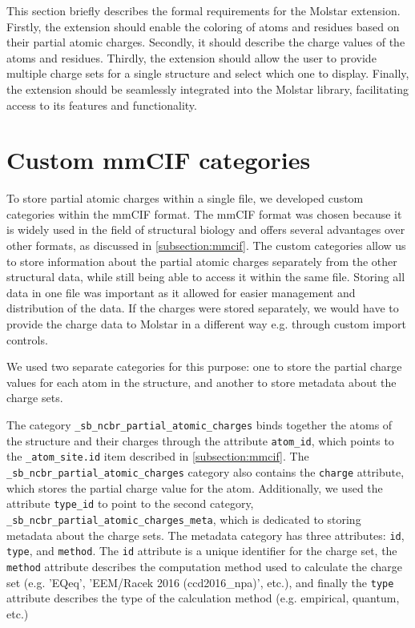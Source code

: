 \documentclass[
  digital,     %
  oneside,     %
  nosansbold,  %
  nocolorbold, %
  lof,         %
  lot,         %
]{fithesis4}
\begin{document}
This section briefly describes the formal requirements for the Molstar extension. Firstly, the extension should enable the coloring of atoms and residues based on their partial atomic charges. Secondly, it should describe the charge values of the atoms and residues. Thirdly, the extension should allow the user to provide multiple charge sets for a single structure and select which one to display. Finally, the extension should be seamlessly integrated into the Molstar library, facilitating access to its features and functionality.

\section{Custom mmCIF categories}
\label{section:custom_mmcif_categories}

To store partial atomic charges within a single file, we developed custom categories within the mmCIF format. The mmCIF format was chosen because it is widely used in the field of structural biology and offers several advantages over other formats, as discussed in \ref{subsection:mmcif}. The custom categories allow us to store information about the partial atomic charges separately from the other structural data, while still being able to access it within the same file. Storing all data in one file was important as it allowed for easier management and distribution of the data. If the charges were stored separately,
we would have to provide the charge data to Molstar in a different way e.g. through custom import controls.


We used two separate categories for this purpose: one to store the partial charge values for each atom in the structure, and another to store metadata about the charge sets.

The category \texttt{\_sb\_ncbr\_partial\_atomic\_charges} binds together the atoms of the structure and their charges through the attribute \texttt{atom\_id}, which points to the \texttt{\_atom\_site.id} item described in \ref{subsection:mmcif}. The \texttt{\_sb\_ncbr\_partial\_atomic\_charges} category also contains the \texttt{charge} attribute, which stores the partial charge value for the atom. Additionally, we used the attribute \texttt{type\_id} to point to the second category, \texttt{\_sb\_ncbr\_partial\_atomic\_charges\_meta}, which is dedicated to storing metadata about the charge sets. The metadata category has three attributes: \texttt{id}, \texttt{type}, and \texttt{method}. The \texttt{id} attribute is a unique identifier for the charge set, the \texttt{method} attribute describes the computation method used to calculate the charge set (e.g. 'EQeq', 'EEM/Racek 2016 (ccd2016\_npa)', etc.), and finally the \texttt{type} attribute describes the type of the calculation method (e.g. empirical, quantum, etc.) 
\end{document}
